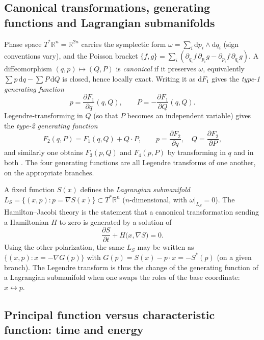 \documentclass[11pt,a4paper]{article}
\newcommand{\R}{\mathbb{R}}
\newcommand{\dd}{\mathrm{d}}
\newcommand{\Pois}[2]{\{#1,#2\}}
\theoremstyle{plain}
\theoremstyle{definition}
\theoremstyle{remark}
\begin{document}
\subsection{Canonical transformations, generating functions and Lagrangian submanifolds}\label{sec:lagrangian}

Phase space $T^*\R^n=\R^{2n}$ carries the symplectic form $\omega=\sum_i\dd p_i\wedge\dd q_i$ (sign conventions vary), and the Poisson bracket $\Pois{f}{g}=\sum_i(\partial_{q_i}f\,\partial_{p_i}g-\partial_{p_i}f\,\partial_{q_i}g)$. A diffeomorphism $(q,p)\mapsto(Q,P)$ is \emph{canonical} if it preserves $\omega$, equivalently $\sum p\,\dd q-\sum P\,\dd Q$ is closed, hence locally exact. Writing it as $\dd F_1$ gives the \emph{type-1 generating function}
\begin{equation}
p=\frac{\partial F_1}{\partial q}(q,Q),\qquad P=-\frac{\partial F_1}{\partial Q}(q,Q).
\end{equation}
Legendre-transforming in $Q$ (so that $P$ becomes an independent variable) gives the \emph{type-2 generating function}
\begin{equation}\label{eq:F2}
F_2(q,P)=F_1(q,Q)+Q\cdot P,\qquad p=\frac{\partial F_2}{\partial q},\quad Q=\frac{\partial F_2}{\partial P},
\end{equation}
and similarly one obtains $F_3(p,Q)$ and $F_4(p,P)$ by transforming in $q$ and in both \cite{Goldstein,Arnold}. The four generating functions are all Legendre transforms of one another, on the appropriate branches.

A fixed function $S(x)$ defines the \emph{Lagrangian submanifold} $L_S=\{(x,p):p=\nabla S(x)\}\subset T^*\R^n$ ($n$-dimensional, with $\omega|_{L_S}=0$). The Hamilton--Jacobi theory is the statement that a canonical transformation sending a Hamiltonian $H$ to zero is generated by a solution of
\begin{equation}
\frac{\partial S}{\partial t}+H\bigl(x,\nabla S\bigr)=0.
\end{equation}
Using the other polarization, the same $L_S$ may be written as $\{(x,p):x=-\nabla G(p)\}$ with $G(p)=S(x)-p\cdot x=-S^*(p)$ (on a given branch). The Legendre transform is thus the change of the generating function of a Lagrangian submanifold when one swaps the roles of the base coordinate: $x\leftrightarrow p$.

\subsection{Principal function versus characteristic function: time and energy}\label{sec:timeenergy}
\end{document}
